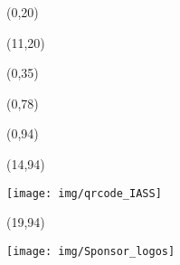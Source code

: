 \documentclass[20pt]{beamer}
\begin{document}
    \begin{frame}

        \begin{textblock}{10}(0,20)
            
        \end{textblock}

        \begin{textblock}{19}(11,20)
            
        \end{textblock}

        \begin{textblock}{30}(0,35)
            
        \end{textblock}

        \begin{textblock}{30}(0,78)
            
        \end{textblock}

        \begin{textblock}{14}(0,94)
            \begin{WhiteBox}
                \vspace{-1cm}
                \begin{block}{}
                    
                    
                \end{block}
            \end{WhiteBox}
        \end{textblock}

        \begin{textblock}{5}(14,94)
            \begin{ClearBox}
                \begin{block}{}
                    \centering
                    \texttt{[image: img/qrcode\_IASS]}
                \end{block}
            \end{ClearBox}
        \end{textblock}

        \begin{textblock}{11}(19,94)
            \begin{WhiteBox}
                \vspace{-1cm}
                \begin{block}{}
                    \texttt{[image: img/Sponsor\_logos]}
                \end{block}
            \end{WhiteBox}
        \end{textblock}
    \end{frame}
\end{document}
